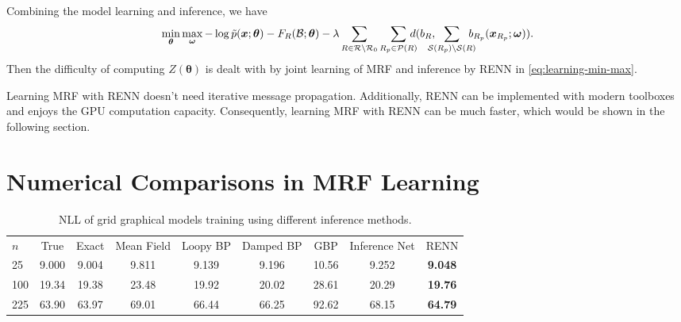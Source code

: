 Combining the model learning and inference, we have
\begin{align}\label{eq:learning-min-max}
  \min_{\bm{\theta}}\max_{\bm{\omega}} -\log{\tilde{p}(\bm{x}; \bm{\theta})} - F_R(\Bb; \bm{\theta}) 
  -\lambda \sum_{R\in \Rr \backslash \Rr_0} \sum_{R_p \in \Pp(R)}\!\!\!\!\!d( b_R, \!\!\!\!\! \sum_{\Ss(R_p)\backslash \Ss(R)}\!\!\!\!\! b_{R_p}(\bm{x}_{R_p}; \bm{\omega})).
\end{align}
Then the difficulty of computing $Z(\bm{\theta})$ is dealt with by joint learning of MRF and inference by RENN in \eqref{eq:learning-min-max}.

Learning MRF with RENN doesn't need iterative message propagation. Additionally, RENN can be implemented with modern toolboxes and enjoys the GPU computation capacity. Consequently, learning MRF with RENN can be much faster, which would be shown in the following section.


\section{Numerical Comparisons in MRF Learning}

\begin{table*}[t]
  \caption{NLL of grid graphical models training using different inference methods.}
  \label{tab:nll-training-grid-n5n10}
  \begin{center}
    \begin{small}
      \setlength\tabcolsep{2pt}
      \begin{tabular}{lcccccccc}
        \toprule
        $n$ & True & Exact & Mean Field & Loopy BP & Damped BP & GBP & Inference Net & RENN \\
        25  &  9.000  &  9.004  &  9.811  &  {9.139}  &  9.196  &  10.56  &  9.252  &  \textbf{9.048}  \\
        100 &  19.34  &  19.38  &  23.48  &  {19.92}  &  20.02  &  28.61  &  20.29  &  \textbf{19.76} \\
        225 &  63.90  &  63.97  &  69.01  &  66.44    &  66.25  &  92.62  &  68.15  &  \textbf{64.79}  \\
        \bottomrule
      \end{tabular}
      
    \end{small}
  \end{center}
\end{table*}


